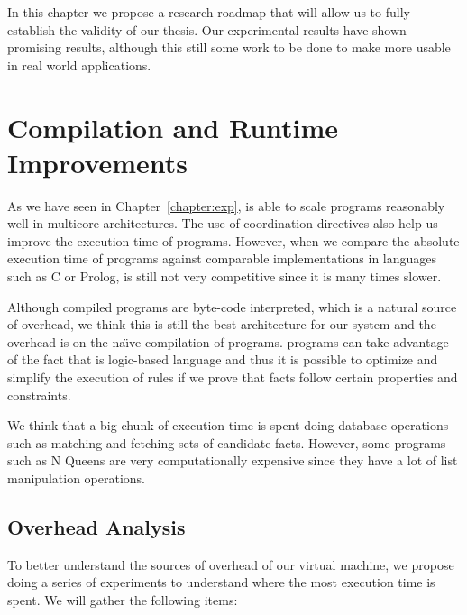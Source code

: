 
In this chapter we propose a research roadmap that will allow us to fully establish the validity of our thesis.
Our experimental results have shown promising results, although this still some work to be done to make
\lang more usable in real world applications.

\section{Compilation and Runtime Improvements}

As we have seen in Chapter~\ref{chapter:exp}, \lang is able to scale programs reasonably well
in multicore architectures.
The use of coordination directives also help us improve the execution time of programs. However,
when we compare the absolute execution time of programs against comparable implementations in
languages such as C or Prolog, \lang is still not very competitive since it is many times slower.

Although compiled \lang programs are byte-code interpreted, which is a natural
source of overhead, we think this is still the best architecture for our system and the overhead
is on the na\"{\i}ve compilation of programs. \lang programs can take advantage of the fact that
\lang is logic-based language and thus it is possible to optimize and simplify the execution of rules
if we prove that facts follow certain properties and constraints.

We think that a big chunk of execution time is spent doing
database operations such as matching and fetching sets of candidate facts.
However, some programs such as N Queens are very computationally expensive since they have
a lot of list manipulation operations.

\subsection{Overhead Analysis}

To better understand the sources of overhead of our virtual machine, we propose doing a series
of experiments to understand where the most execution time is spent. We will gather the following
items:

